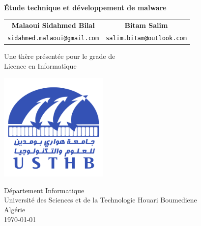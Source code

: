 
\begin{titlepage}
    \begin{center}
        \vspace*{1cm}
        
        \Huge
        \textbf{Étude technique et développement de malware}
        
        \vspace{0.5cm}
        \Large
        
        \vspace{1.5cm}
        
        \begin{tabular}{cc}
    
            \textbf{Malaoui Sidahmed Bilal} & \textbf{Bitam Salim} \\
            \texttt{\normalsize{sidahmed.malaoui@gmail.com}} & \texttt{\normalsize{salim.bitam@outlook.com}} \\

        \end{tabular}
        \vfill
        
        Une thère présentée pour le grade de\\
        Licence en Informatique
        
        \vspace{0.8cm}
        
        \includegraphics[width=0.4\textwidth]{images/USTHB_Logo.png}
        
        \LARGE
        Département Informatique\\
        Université des Sciences et de la Technologie Houari Boumediene\\
        Algérie\\
        \today
        
    \end{center}
\end{titlepage}

